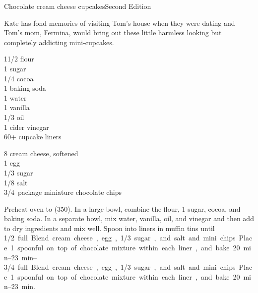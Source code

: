 \begin{entry}{Chocolate cream cheese cupcakes}{Second Edition}

\begin{open}
  Kate has fond memories of visiting Tom's house when they were dating and Tom's mom, Fermina, would bring out these little harmless looking but completely addicting mini-cupcakes.
\end{open}
\begin{ingredients}
    1\SI{1/2}{\cup} flour\\
    \SI{1}{\cup} sugar\\
    \SI{1/4}{\cup} cocoa\\
    \SI{1}{\teaspoon} baking soda\\
    \SI{1}{\cup} water\\
    \SI{1}{\teaspoon} vanilla\\
    \SI{1/3}{\cup} oil\\
    \SI{1}{\tblspoon} cider vinegar\\
    60+ cupcake liners
\end{ingredients}


\begin{ingredients}
    \SI{8}{\ounce} cream cheese, softened\\
    1 egg\\
    \SI{1/3}{\cup} sugar\\
    \SI{1/8}{\teaspoon} salt\\
    \SI{3/4}{package} miniature chocolate chips
\end{ingredients}
Preheat oven to (\SI{350}{\degreeF}). In a large bowl, combine the flour,
\SI{1}{\cup} sugar, cocoa, and baking soda. In a separate bowl, mix water,
vanilla, oil, and vinegar and then add to dry ingredients and mix well. Spoon
into liners in muffin tins until \SIrange{1/2}{3/4} full. Blend cream cheese,
egg, \SI{1/3}{\cup} sugar, and salt and mini chips. Place 1 spoonful on top of
chocolate mixture within each liner, and bake \SIrange{20}{23}{\minute}.
\end{entry}

